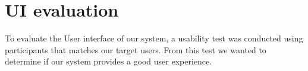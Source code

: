 \section*{UI evaluation}
To evaluate the User interface of our system, a usability test was conducted using participants that matches our target users. From this test we wanted to determine if our system provides a good user experience.








